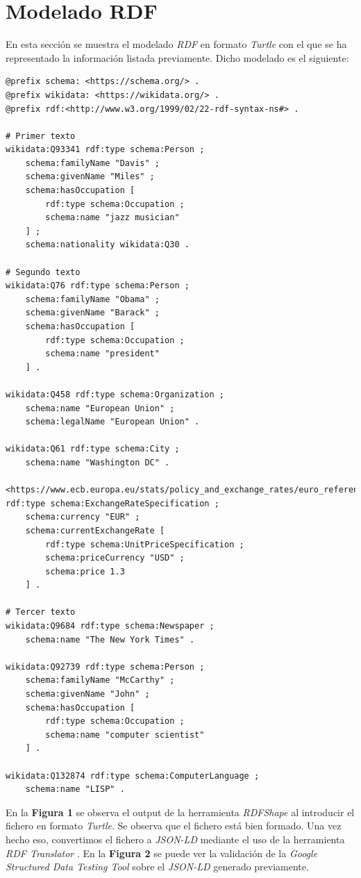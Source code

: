 \documentclass[11pt]{article}
\begin{document}
\section{Modelado RDF}
En esta sección se muestra el modelado \textit{RDF} en formato \textit{Turtle} con el que se ha representado la información listada previamente. Dicho modelado es el siguiente:

\begin{lstlisting}
@prefix schema: <https://schema.org/> .
@prefix wikidata: <https://wikidata.org/> .
@prefix rdf:<http://www.w3.org/1999/02/22-rdf-syntax-ns#> .

# Primer texto
wikidata:Q93341 rdf:type schema:Person ;
    schema:familyName "Davis" ;
    schema:givenName "Miles" ;
    schema:hasOccupation [
        rdf:type schema:Occupation ;
        schema:name "jazz musician"
    ] ;
    schema:nationality wikidata:Q30 .

# Segundo texto
wikidata:Q76 rdf:type schema:Person ;
    schema:familyName "Obama" ;
    schema:givenName "Barack" ;
    schema:hasOccupation [
        rdf:type schema:Occupation ;
        schema:name "president"
    ] .

wikidata:Q458 rdf:type schema:Organization ;
    schema:name "European Union" ;
    schema:legalName "European Union" .

wikidata:Q61 rdf:type schema:City ;
    schema:name "Washington DC" .

<https://www.ecb.europa.eu/stats/policy_and_exchange_rates/euro_reference_exchange_rates/html/index.en.html> rdf:type schema:ExchangeRateSpecification ;
    schema:currency "EUR" ;
    schema:currentExchangeRate [
        rdf:type schema:UnitPriceSpecification ;
        schema:priceCurrency "USD" ;
        schema:price 1.3
    ] .

# Tercer texto
wikidata:Q9684 rdf:type schema:Newspaper ;
    schema:name "The New York Times" .

wikidata:Q92739 rdf:type schema:Person ;
    schema:familyName "McCarthy" ;
    schema:givenName "John" ;
    schema:hasOccupation [
        rdf:type schema:Occupation ;
        schema:name "computer scientist"
    ] .

wikidata:Q132874 rdf:type schema:ComputerLanguage ;
    schema:name "LISP" .
\end{lstlisting}

En la \textbf{Figura 1} se observa el output de la herramienta \textit{RDFShape} al introducir el fichero en formato \textit{Turtle}. Se observa que el fichero está bien formado. Una vez hecho eso, convertimos el fichero a \textit{JSON-LD} mediante el uso de la herramienta \textit{RDF Translator} \cite{rdftranslator}. En la \textbf{Figura 2} se puede ver la validación de la \textit{Google Structured Data Testing Tool} \cite{googlesdtt} sobre el \textit{JSON-LD} generado previamente.
\end{document}
